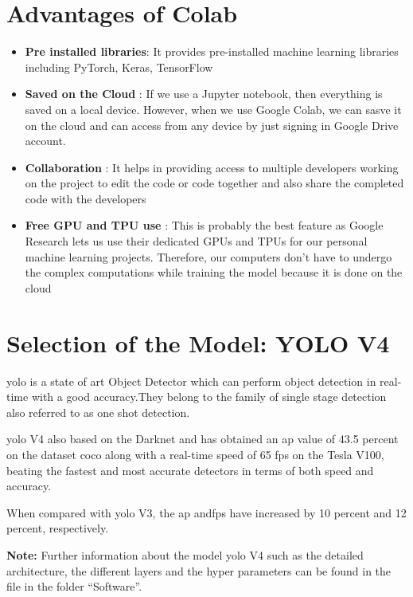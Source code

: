 \section{Advantages of Colab} 

\begin{itemize}  
	\item \textbf{Pre installed libraries}: It provides pre-installed machine learning libraries including PyTorch, Keras, TensorFlow
	\item \textbf{Saved on the Cloud} : If we use a Jupyter notebook, then everything is saved on a local device. However, when we use Google Colab, we can sasve it on the cloud and can access from any device by just signing in Google Drive account.
	\item \textbf{Collaboration} : It helps in providing access to multiple developers working on the project to edit the code or code together and also share the completed code with the developers
	\item \textbf{Free GPU and TPU use} : 
	This is probably the best feature as Google Research lets us use their dedicated GPUs and TPUs for our personal machine learning projects. Therefore, our computers don’t have to undergo the complex computations while training the model because it is done on the cloud
	
\end{itemize}




\section{Selection of the Model: YOLO V4} 

\ac{yolo} is a state of art Object Detector which can perform object detection in real-time with a good accuracy.They belong to the family of single stage detection also referred to as one shot detection.

\ac{yolo} V4 also based on the Darknet and has obtained an \ac{ap} value of 43.5 percent on the dataset \ac{coco} along with a real-time speed of 65 \ac{fps} on the Tesla V100, beating the fastest and most accurate detectors in terms of both speed and accuracy.

When compared with \ac{yolo} V3, the \ac{ap} and\ac{fps} have increased by 10 percent and 12 percent, respectively.

\textbf{Note: }Further information about the model \ac{yolo} V4 such as the detailed architecture, the different layers and the hyper parameters can be found in the file in the  folder ``Software''.


